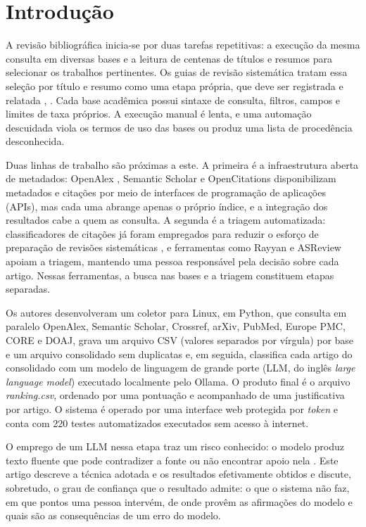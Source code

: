 \documentclass[10pt,a4paper,twocolumn]{article}
\newcommand{\cod}[1]{\textit{#1}}
\begin{document}
\section{Introdução}

A revisão bibliográfica inicia-se por duas tarefas repetitivas: a execução da mesma consulta em diversas bases e a leitura de centenas de títulos e resumos para selecionar os trabalhos pertinentes. Os guias de revisão sistemática tratam essa seleção por título e resumo como uma etapa própria, que deve ser registrada e relatada \cite{kitchenham}, \cite{prisma}. Cada base acadêmica possui sintaxe de consulta, filtros, campos e limites de taxa próprios. A execução manual é lenta, e uma automação descuidada viola os termos de uso das bases ou produz uma lista de procedência desconhecida.

Duas linhas de trabalho são próximas a este. A primeira é a infraestrutura aberta de metadados: OpenAlex \cite{openalex}, Semantic Scholar \cite{s2} e OpenCitations \cite{opencitations} disponibilizam metadados e citações por meio de interfaces de programação de aplicações (APIs), mas cada uma abrange apenas o próprio índice, e a integração dos resultados cabe a quem as consulta. A segunda é a triagem automatizada: classificadores de citações já foram empregados para reduzir o esforço de preparação de revisões sistemáticas \cite{cohen}, e ferramentas como Rayyan \cite{rayyan} e ASReview \cite{asreview} apoiam a triagem, mantendo uma pessoa responsável pela decisão sobre cada artigo. Nessas ferramentas, a busca nas bases e a triagem constituem etapas separadas.

Os autores desenvolveram um coletor para Linux, em Python, que consulta em paralelo OpenAlex, Semantic Scholar, Crossref, arXiv, PubMed, Europe PMC, CORE e DOAJ, grava um arquivo CSV (valores separados por vírgula) por base e um arquivo consolidado sem duplicatas e, em seguida, classifica cada artigo do consolidado com um modelo de linguagem de grande porte (LLM, do inglês \emph{large language model}) executado localmente pelo Ollama. O produto final é o arquivo \cod{ranking.csv}, ordenado por uma pontuação e acompanhado de uma justificativa por artigo. O sistema é operado por uma interface web protegida por \emph{token} e conta com 220 testes automatizados executados sem acesso à internet.

O emprego de um LLM nessa etapa traz um risco conhecido: o modelo produz texto fluente que pode contradizer a fonte ou não encontrar apoio nela \cite{ji}. Este artigo descreve a técnica adotada e os resultados efetivamente obtidos e discute, sobretudo, o grau de confiança que o resultado admite: o que o sistema não faz, em que pontos uma pessoa intervém, de onde provêm as afirmações do modelo e quais são as consequências de um erro do modelo.
\end{document}
